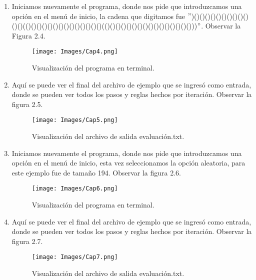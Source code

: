 \begin{enumerate}
\newpage
\item Iniciamos nuevamente el programa, donde nos pide que introduzcamos una opción en el menú de inicio, la cadena que digitamos fue $"$)()()()()()()()()()()()()(()()()()()()()()()()()()()()(()()()()()()()()()()()()()()()()))$"$. Observar la Figura 2.4.
\begin{figure}[h]
    \begin{center}
    \texttt{[image: Images/Cap4.png]}
    \end{center}
\caption{Visualización del programa en terminal.}
\label{fig:imagen}
\end{figure}

\newpage
\item Aquí se puede ver el final del archivo de ejemplo que se ingresó como entrada, donde se pueden ver todos los pasos y reglas hechos por iteración. Observar la figura 2.5.

\begin{figure}[h]
    \begin{center}
    \texttt{[image: Images/Cap5.png]}
    \end{center}
\caption{Visualización del archivo de salida evaluación.txt.}
\label{fig:imagen}
\end{figure}

\newpage
\item Iniciamos nuevamente el programa, donde nos pide que introduzcamos una opción en el menú de inicio, esta vez seleccionamos la opción aleatoria, para este ejemplo fue de tamaño 194. Observar la figura 2.6.

\begin{figure}[h]
    \begin{center}
    \texttt{[image: Images/Cap6.png]}
    \end{center}
\caption{Visualización del programa en terminal.}
\label{fig:imagen}
\end{figure}
\newpage
\item Aquí se puede ver el final del archivo de ejemplo que se ingresó como entrada, donde se pueden ver todos los pasos y reglas hechos por iteración. Observar la figura 2.7.

\begin{figure}[h]
    \begin{center}
    \texttt{[image: Images/Cap7.png]}
    \end{center}
\caption{Visualización del archivo de salida evaluación.txt.}
\label{fig:imagen}
\end{figure}

\end{enumerate}